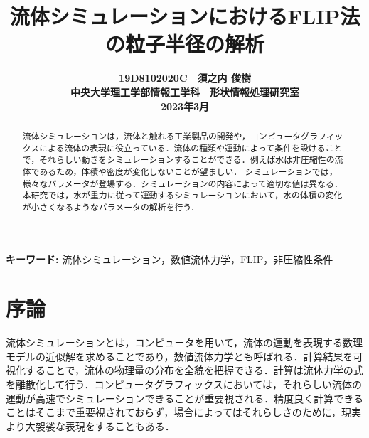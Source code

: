 \documentclass[10pt,a4paper,notitlepage,oneside,twocolumn]{abst_jsarticle}
\title{
{\bf 流体シミュレーションにおけるFLIP法の粒子半径の解析}
}
\author{\begin{center}
{\large {\bf 19D8102020C　須之内 俊樹}}\\
{\large {\bf 中央大学理工学部情報工学科　形状情報処理研究室}}\\
{\large {\bf 2023年3月}}
\end{center}}
\date{}
\begin{document}
\maketitle


\begin{abstract}
流体シミュレーションは，流体と触れる工業製品の開発や，コンピュータグラフィックスによる流体の表現に役立っている．流体の種類や運動によって条件を設けることで，それらしい動きをシミュレーションすることができる．例えば水は非圧縮性の流体であるため，体積や密度が変化しないことが望ましい．
シミュレーションでは，様々なパラメータが登場する．シミュレーションの内容によって適切な値は異なる．本研究では，水が重力に従って運動するシミュレーションにおいて，水の体積の変化が小さくなるようなパラメータの解析を行う．
\end{abstract}

\vspace{1zw} \noindent
{\bf キーワード: }流体シミュレーション，数値流体力学，FLIP，非圧縮性条件

\section{序論} \label{sec:intro}

流体シミュレーションとは，コンピュータを用いて，流体の運動を表現する数理モデルの近似解を求めることであり，数値流体力学とも呼ばれる．計算結果を可視化することで，流体の物理量の分布を全貌を把握できる．計算は流体力学の式を離散化して行う．コンピュータグラフィックスにおいては，それらしい流体の運動が高速でシミュレーションできることが重要視される．精度良く計算できることはそこまで重要視されておらず，場合によってはそれらしさのために，現実より大袈裟な表現をすることもある．
\end{document}
